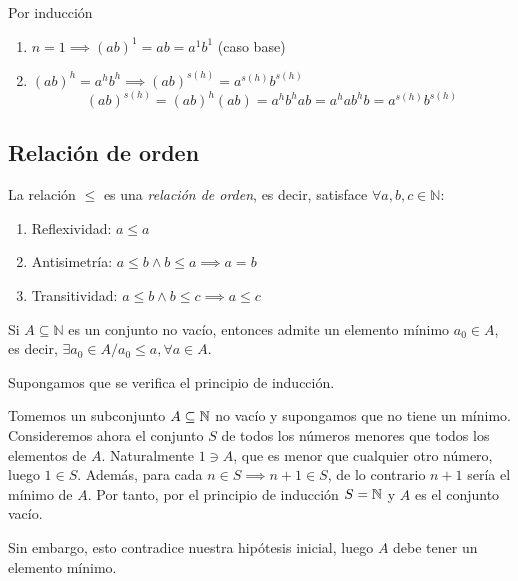 \begin{fmd-proof}
	 Por inducción
	\begin{enumerate}[label=\roman*)]
		\item $n=1 \implies (ab)^1 = ab = a^1 b^1$ (caso base)
		\item $(ab)^h = a^h b^h \implies (ab)^{s(h)} = a^{s(h)}b^{s(h)}$
		\[ (ab)^{s(h)} = (ab)^h (ab) = a^hb^hab = a^ha b^hb = a^{s(h)}b^{s(h)} \]
	\end{enumerate}
\end{fmd-proof}


\subsection{Relación de orden}
\vspace{3mm}
\begin{fmd-definition}
	La relación $\le$ es una \textit{relación de orden}, es decir, satisface $\forall a, b, c \in \mathbb{N}$:
	\begin{enumerate}
		\item Reflexividad: $a \le a $
		\item Antisimetría: $a \le b \land b \le a \implies a=b$
		\item Transitividad: $a \le b \land b \le c \implies a \le c$
	\end{enumerate}
\end{fmd-definition}

\begin{fmd-theorem}
	Si $A \subseteq \mathbb{N}$ es un conjunto no vacío, entonces admite un elemento mínimo $a_0 \in A$, es decir, $\exists a_0 \in A / a_0 \le a, \forall a \in A$.
\end{fmd-theorem}

\begin{fmd-proof}
	Supongamos que se verifica el principio de inducción.
	
	Tomemos un subconjunto $A \subseteq \mathbb{N}$ no vacío y supongamos que no tiene un mínimo. Consideremos ahora el conjunto $S$ de todos los números menores que todos los elementos de $A$. Naturalmente $1 \ni A$, que es menor que cualquier otro número, luego $1 \in S$. Además, para cada $n \in S \implies n + 1 \in S$, de lo contrario $n+1$ sería el mínimo de $A$. Por tanto, por el principio de inducción $S = \mathbb{N}$ y $A$ es el conjunto vacío.
	
	Sin embargo, esto contradice nuestra hipótesis inicial, luego $A$ debe tener un elemento mínimo.
\end{fmd-proof}

